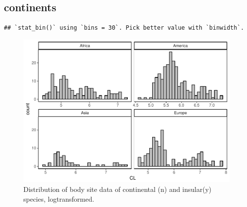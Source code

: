 \documentclass[]{article}
\begin{document}
\subsection{continents}\label{continents}

\begin{verbatim}
## `stat_bin()` using `bins = 30`. Pick better value with `binwidth`.
\end{verbatim}

\begin{figure}[htbp]
\centering
\includegraphics{MA_JJ_files/figure-latex/Histograms of body size data, split by continents-1.pdf}
\caption{Distribution of body site data of continental (n) and
insular(y) species, logtransformed.}
\end{figure}

\newpage
\end{document}
